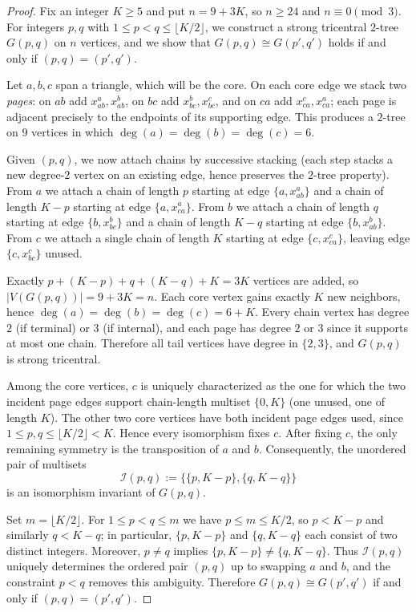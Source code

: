 \documentclass[10pt,a4paper]{amsart}
\begin{document}
\begin{proof}
Fix an integer $K\ge 5$ and put $n=9+3K$, so $n\ge 24$ and $n\equiv 0\pmod 3$.
For integers $p,q$ with $1\le p<q\le \lfloor K/2\rfloor$, we construct a strong 
tricentral $2$-tree $G(p,q)$ on $n$ vertices, and we show that $G(p,q)\cong G(p',q')$ 
holds if and only if $(p,q)=(p',q')$.

Let $a,b,c$ span a triangle, which will be the core. On each core edge we stack 
two \emph{pages}: on $ab$ add $x_{ab}^a,x_{ab}^b$, on $bc$ add $x_{bc}^b,x_{bc}^c$, 
and on $ca$ add $x_{ca}^c,x_{ca}^a$; each page is adjacent precisely to the 
endpoints of its supporting edge. This produces a $2$-tree on $9$ vertices in 
which $\deg(a)=\deg(b)=\deg(c)=6$.

Given $(p,q)$, we now attach chains by successive stacking (each step stacks a 
new degree-$2$ vertex on an existing edge, hence preserves the $2$-tree property).
From $a$ we attach a chain of length $p$ starting at edge $\{a, x_{ab}^a\}$ and 
a chain of length $K-p$ starting at edge $\{a, x_{ca}^a\}$. From $b$ we attach 
a chain of length $q$ starting at edge $\{b, x_{bc}^b\}$ and a chain of length 
$K-q$ starting at edge $\{b, x_{ab}^b\}$. From $c$ we attach a single chain of 
length $K$ starting at edge $\{c, x_{ca}^c\}$, leaving edge $\{c, x_{bc}^c\}$ unused.

Exactly $p+(K-p)+q+(K-q)+K=3K$ vertices are added, so $|V(G(p,q))|=9+3K=n$.
Each core vertex gains exactly $K$ new neighbors, hence $\deg(a)=\deg(b)=\deg(c)=6+K$.
Every chain vertex has degree $2$ (if terminal) or $3$ (if internal), and each 
page has degree $2$ or $3$ since it supports at most one chain. Therefore all 
tail vertices have degree in $\{2,3\}$, and $G(p,q)$ is strong tricentral.

Among the core vertices, $c$ is uniquely characterized as the one for which the 
two incident page edges support chain-length multiset $\{0,K\}$ (one unused, one 
of length $K$). The other two core vertices have both incident page edges used, 
since $1\le p,q\le \lfloor K/2\rfloor <K$. Hence every isomorphism fixes $c$.
After fixing $c$, the only remaining symmetry is the transposition of $a$ and $b$.
Consequently, the unordered pair of multisets
\[
\mathcal{I}(p,q):=\bigl\{\{p,K-p\},\{q,K-q\}\bigr\}
\]
is an isomorphism invariant of $G(p,q)$.

Set $m=\lfloor K/2\rfloor$. For $1\le p<q\le m$ we have $p\le m\le K/2$, so 
$p<K-p$ and similarly $q<K-q$; in particular, $\{p,K-p\}$ and $\{q,K-q\}$ 
each consist of two distinct integers. Moreover, $p\neq q$ implies 
$\{p,K-p\}\neq \{q,K-q\}$. Thus $\mathcal{I}(p,q)$ uniquely determines the 
ordered pair $(p,q)$ up to swapping $a$ and $b$, and the constraint $p<q$ 
removes this ambiguity. Therefore $G(p,q)\cong G(p',q')$ if and only if $(p,q)=(p',q')$.


\end{proof}
\end{document}
